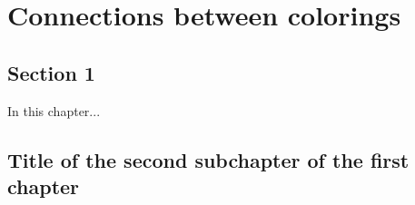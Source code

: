 \chapter{Connections between colorings}

\section{Section 1}

In this chapter...

\section{Title of the second subchapter of the first chapter}
